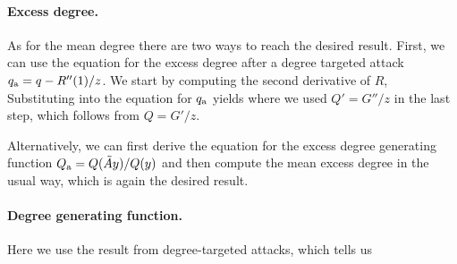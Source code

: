 \paragraph{Excess degree.} As for the mean degree there are two ways to reach the desired result. First, we can use the equation for the excess degree after a degree targeted attack $q_{\rm a}=q-R''(1)/z$. We start by computing the second derivative of $R$,
Substituting into the equation for $q_{\rm a}$ yields
where we used $Q'=G''/z$ in the last step, which follows from $Q=G'/z$. 

Alternatively, we can first derive the equation for the excess degree generating function $Q_{\rm a}=Q(\tilde{A}y)/Q(y)$ and then compute the mean excess degree in the usual way,
which is again the desired result. 

\paragraph{Degree generating function.} Here we use the result from degree-targeted attacks, which tells us

